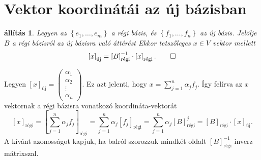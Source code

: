 \documentclass[9pt, a4paper, showtrims]{memoir}
\makeatletter
\renewenvironment{proof}[1][\proofname]
    {\par\pushQED{\qed}%
    \normalfont \topsep6\p@\@plus6\p@\relax
    \trivlist
    \item[\hskip\labelsep
        \itshape
    #1\@addpunct{:}]\ignorespaces}
    {\popQED\endtrivlist\@endpefalse}
\theoremstyle{plain}
\newtheorem{proposition}{állítás}[chapter]
\theoremstyle{remark}
\theoremstyle{definition}
\newcommand{\uj}{\text{új}}
\newcommand{\rgi}{\text{régi}}
\makeatother
\begin{document}
\section{Vektor koordinátái az új bázisban}
\begin{proposition}
    Legyen az $\left\{ e_1,\dots,e_m \right\}$ a régi bázis,
    és $\left\{ f_1,\dots,f_n \right\}$ az új bázis.
    Jelölje $B$ a régi bázisról az új bázisra való áttérést
    Ekkor tetszőleges $x\in V$ vektor mellett
    \[
        \left[ x \right]_\uj
        =
        \left[ B \right]_\rgi^{-1}
        \cdot
        \left[ x \right]_\rgi.\qedhere
    \]
\end{proposition}
\begin{proof}
    Legyen 
    $
    \left[ x \right]_\uj
    =
    \begin{pmatrix}
        \alpha_1 \\ \alpha_2 \\ \vdots \\ \alpha_n
    \end{pmatrix}.
    $
    Ez azt jelenti, hogy $x=\sum_{j=1}^n\alpha_jf_j$.
    Így felírva az $x$ vektornak a régi bázisra vonatkozó koordináta-vektorát
    \[
        \left[ x \right]_\rgi
        =\left[ \sum_{j=1}^n\alpha_jf_j \right]_\rgi
        =\sum_{j=1}^n\alpha_j\left[ f_j \right]_\rgi
        =\sum_{j=1}^n\alpha_j\left[ B \right]_\rgi^j
        =\left[ B \right]_\rgi\cdot \left[ x \right]_\uj.
    \]
    A kívánt azonosságot kapjuk, 
    ha balról szorozzuk mindkét oldalt $\left[ B \right]^{-1}_\rgi$ inverz mátrixszal.
\end{proof}
\end{document}
